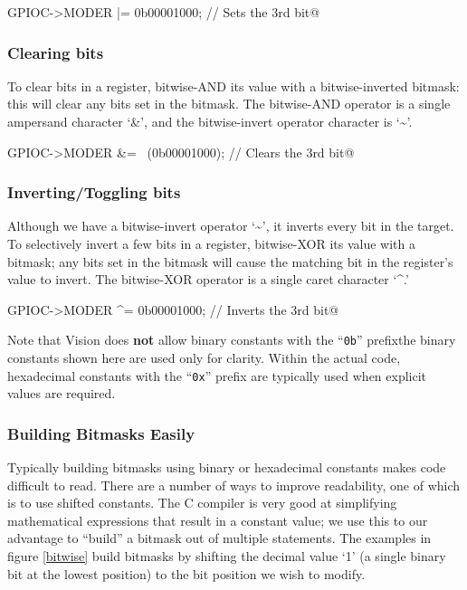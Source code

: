\documentclass[openany,11pt,fleqn]{book} %
\makeatletter
\newcommand{\ilcode}[1]{
    \begin{center} \parskip=-15pt \colorbox{gray!20!white}{
        \parbox{\columnwidth-2\fboxsep}{
            \lstinline@#1@
        }
    } \end{center}
}
\makeatother
\begin{document}
\ilcode{GPIOC->MODER |= 0b00001000;    // Sets the 3rd bit}%

\subsubsection{Clearing bits}
To clear bits in a register, bitwise-AND its value with a bitwise-inverted bitmask: this will clear any bits set in the bitmask. The bitwise-AND operator is a single ampersand character `\&', and the bitwise-invert operator character is `\textasciitilde'.
\ilcode{GPIOC->MODER \&= ~(0b00001000);    // Clears the 3rd bit}%

\subsubsection{Inverting/Toggling bits}
Although we have a bitwise-invert operator `\textasciitilde', it inverts every bit in the target. To selectively invert a few bits in a register, bitwise-XOR its value with a bitmask; any bits set in the bitmask will cause the matching bit in the register's value to invert. The bitwise-XOR operator is a single caret character `\textasciicircum.'

\ilcode{GPIOC->MODER ^= 0b00001000;    // Inverts the 3rd bit}%

\begin{warning}
    Note that {\textmu}Vision does \textbf{not} allow binary constants with the ``\texttt{0b}'' prefix\textemdash the binary constants shown here are used only for clarity. Within the actual code, hexadecimal constants with the ``\texttt{0x}'' prefix are typically used when explicit values are required.  
\end{warning}

\subsubsection{Building Bitmasks Easily}

Typically building bitmasks using binary or hexadecimal constants makes code difficult to read. There are a number of ways to improve readability, one of which is to use shifted constants. The C compiler is very good at simplifying mathematical expressions that result in a constant value; we use this to our advantage to ``build'' a bitmask out of multiple statements. The examples in figure \ref{bitwise} build bitmasks by shifting the decimal value `1' (a single binary bit at the lowest position) to the bit position we wish to modify.
\end{document}
